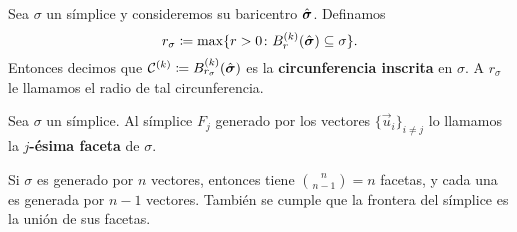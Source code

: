 \begin{definition}
	Sea $\sigma$ un símplice y consideremos su baricentro $\hat{\boldsymbol{ \sigma }}$. Definamos
	\begin{equation}
		\label{eq:def:r-sigma}
		r_\sigma \coloneq \max \lbrace r > 0 \colon B_r^{(k)}(\hat{\boldsymbol{ \sigma }})
		\subseteq \sigma \rbrace.
	\end{equation}
	Entonces decimos que $\mathcal{C}^{(k)} \coloneq
	B_{r_\sigma}^{(k)}(\hat{\boldsymbol{ \sigma }})$ es la \textbf{circunferencia inscrita} en $\sigma$. A
	$r_\sigma$ le llamamos el radio de tal circunferencia.
\end{definition}

\begin{definition}
	Sea $\sigma$ un símplice. Al símplice $F_j$ generado por los vectores $\lbrace \vec{u}_i
	\rbrace_{i \neq j}$ lo llamamos la \textbf{$j$-ésima faceta} de $\sigma$.
\end{definition}
\begin{observation}
	Si $\sigma$ es generado por $n$ vectores, entonces tiene $\binom{n}{n-1} = n$ facetas, y cada
	una es generada por $n - 1$ vectores. También se cumple que la frontera del símplice es la unión
	de sus facetas.
\end{observation}

